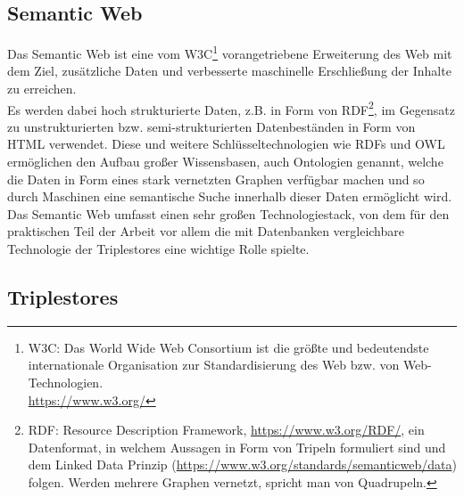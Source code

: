 \documentclass{article}
\begin{document}
\subsection{Semantic Web}

Das Semantic Web ist eine vom W3C\footnote{W3C: Das World Wide Web Consortium ist die größte und bedeutendste internationale Organisation zur Standardisierung des Web bzw. von Web-Technologien.\\ \url{https://www.w3.org/} } vorangetriebene Erweiterung des Web mit dem Ziel, zusätzliche Daten und verbesserte maschinelle Erschließung der Inhalte zu erreichen.\\

Es werden dabei hoch strukturierte Daten, z.B. in Form von RDF\footnote{RDF: Resource Description Framework, \url{https://www.w3.org/RDF/}, ein Datenformat, in welchem Aussagen in Form von Tripeln formuliert sind und dem Linked Data Prinzip (\url{https://www.w3.org/standards/semanticweb/data}) folgen. Werden mehrere Graphen vernetzt, spricht man von Quadrupeln.}, im Gegensatz zu unstrukturierten bzw. semi-strukturierten Datenbeständen in Form von HTML verwendet. Diese und weitere Schlüsseltechnologien wie RDFs und OWL ermöglichen den Aufbau großer Wissensbasen, auch Ontologien genannt, welche die Daten in Form eines stark vernetzten Graphen verfügbar machen und so durch Maschinen eine semantische Suche innerhalb dieser Daten ermöglicht wird.\\
Das Semantic Web umfasst einen sehr großen Technologiestack, von dem für den praktischen Teil der Arbeit vor allem die mit Datenbanken vergleichbare Technologie der Triplestores eine wichtige Rolle spielte.

\subsection{Triplestores}
\end{document}
